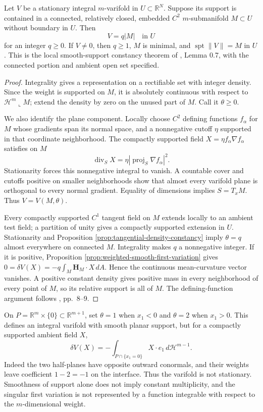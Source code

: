 \begin{theorem}\label{thm:varifold-smooth-constancy}
Let $V$ be a stationary integral $m$-varifold in $U\subset\mathbb R^N$. Suppose its support is contained in a connected, relatively closed, embedded $C^2$ $m$-submanifold $M\subset U$ without boundary in $U$. Then
\[
 V=q|M|\quad\text{in }U
\]
for an integer $q\geq0$. If $V\ne0$, then $q\geq1$, $M$ is minimal, and $\operatorname{spt}\|V\|=M$ in $U$. This is the local smooth-support constancy theorem of \cite{Minter}, Lemma 0.7, with the connected portion and ambient open set specified.
\end{theorem}
\begin{proof}
Integrality gives a representation on a rectifiable set with integer density. Since the weight is supported on $M$, it is absolutely continuous with respect to $\mathcal H^m\llcorner M$; extend the density by zero on the unused part of $M$. Call it $\theta\geq0$.

We also identify the plane component. Locally choose $C^2$ defining functions $f_\alpha$ for $M$ whose gradients span its normal space, and a nonnegative cutoff $\eta$ supported in that coordinate neighborhood. The compactly supported field $X=\eta f_\alpha\nabla f_\alpha$ satisfies on $M$
\[
 \operatorname{div}_S X=\eta|\operatorname{proj}_S\nabla f_\alpha|^2.
\]
Stationarity forces this nonnegative integral to vanish. A countable cover and cutoffs positive on smaller neighborhoods show that almost every varifold plane is orthogonal to every normal gradient. Equality of dimensions implies $S=T_xM$. Thus $V=V(M,\theta)$.

Every compactly supported $C^1$ tangent field on $M$ extends locally to an ambient test field; a partition of unity gives a compactly supported extension in $U$. Stationarity and Proposition \ref{prop:tangential-density-constancy} imply $\theta=q$ almost everywhere on connected $M$. Integrality makes $q$ a nonnegative integer. If it is positive, Proposition \ref{prop:weighted-smooth-first-variation} gives
$0=\delta V(X)=-q\int_M\mathbf H_M\cdot X\,dA$. Hence the continuous mean-curvature vector vanishes. A positive constant density gives positive mass in every neighborhood of every point of $M$, so its relative support is all of $M$. The defining-function argument follows \cite{Minter}, pp.~8--9.
\end{proof}

\begin{example}\label{ex:jump-multiplicity}
On $P=\mathbb R^m\times\{0\}\subset\mathbb R^{m+1}$, set $\theta=1$ when $x_1<0$ and $\theta=2$ when $x_1>0$. This defines an integral varifold with smooth planar support, but for a compactly supported ambient field $X$,
\[
 \delta V(X)=-\int_{P\cap\{x_1=0\}}X\cdot e_1\,d\mathcal H^{m-1}.
\]
Indeed the two half-planes have opposite outward conormals, and their weights leave coefficient $1-2=-1$ on the interface. Thus the varifold is not stationary. Smoothness of support alone does not imply constant multiplicity, and the singular first variation is not represented by a function integrable with respect to the $m$-dimensional weight.
\end{example}

